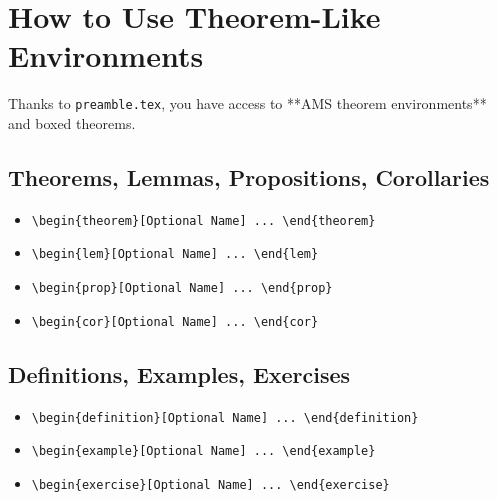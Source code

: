 \section{How to Use Theorem-Like Environments}
Thanks to \verb|preamble.tex|, you have access to **AMS theorem environments** and boxed theorems.  

\subsection*{Theorems, Lemmas, Propositions, Corollaries}
\begin{itemize}
    \item \verb|\begin{theorem}[Optional Name] ... \end{theorem}|
    \item \verb|\begin{lem}[Optional Name] ... \end{lem}|
    \item \verb|\begin{prop}[Optional Name] ... \end{prop}|
    \item \verb|\begin{cor}[Optional Name] ... \end{cor}|
\end{itemize}

\subsection*{Definitions, Examples, Exercises}
\begin{itemize}
    \item \verb|\begin{definition}[Optional Name] ... \end{definition}|
    \item \verb|\begin{example}[Optional Name] ... \end{example}|
    \item \verb|\begin{exercise}[Optional Name] ... \end{exercise}|
\end{itemize}


